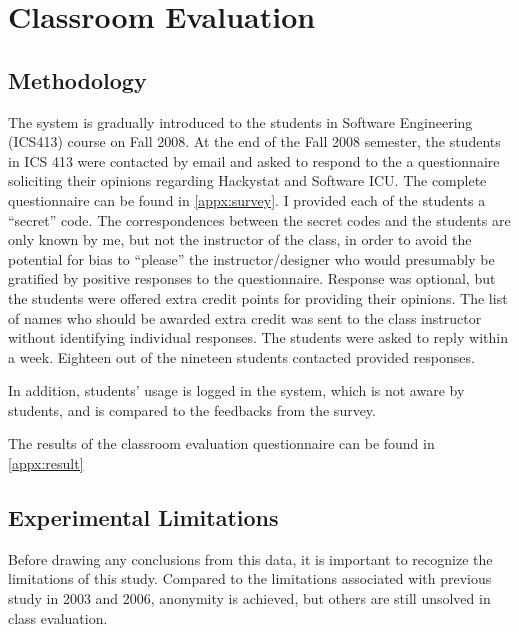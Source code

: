 
\chapter{Classroom Evaluation}

\section{Methodology}
The system is gradually introduced to the students in Software Engineering (ICS413) course on Fall 2008. At the end of the Fall 2008 semester, the students in ICS 413 were contacted by email and asked to respond to the a questionnaire soliciting their opinions regarding Hackystat and Software ICU. The complete questionnaire can be found in \autoref{appx:survey}. I provided each of the students a ``secret'' code. The correspondences between the secret codes and the students are only known by me, but not the instructor of the class, in order to avoid the potential for bias to ``please'' the instructor/designer who would presumably be gratified by positive responses to the questionnaire. Response was optional, but the students were offered extra credit points for providing their opinions. The list of names who should be awarded extra credit was sent to the class instructor without identifying individual responses. The students were asked to reply within a week. Eighteen out of the nineteen students contacted provided responses. 

In addition, students' usage is logged in the system, which is not aware by students, and is compared to the feedbacks from the survey.

The results of the classroom evaluation questionnaire can be found in \autoref{appx:result}

\section {Experimental Limitations}

Before drawing any conclusions from this data, it is important to recognize the limitations of this study. Compared to the limitations associated with previous study in 2003 and 2006, anonymity is achieved, but others are still unsolved in class evaluation.

